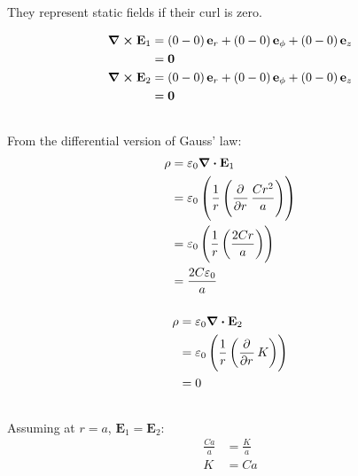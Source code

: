 \subsection{}
They represent static fields if their curl is zero.

\begin{align*}
    \curl{\mathbf{E}_1} & = \del{0 - 0}\mathbf{e}_r + \del{0 - 0}\mathbf{e}_{\phi} + \del{0 - 0}\mathbf{e}_z\\
    & = \mathbf{0}\\
    \curl{\mathbf{E}_2} & = \del{0 - 0}\mathbf{e}_r + \del{0 - 0}\mathbf{e}_{\phi} + \del{0 - 0}\mathbf{e}_z\\
    & = \mathbf{0}
\end{align*}

\subsection{}
\subsubsection{}
From the differential version of Gauss' law:
\begin{align*}
    \rho & = \varepsilon_0 \div{\mathbf{E}_1}\\
    & = \varepsilon_0 \del{\frac{1}{r} \del{\dpd{}{r} \frac{Cr^2}{a}}}\\
    & = \varepsilon_0 \del{\frac{1}{r} \del{\frac{2Cr}{a}}}\\
    & = \frac{2C \varepsilon_0}{a}
\end{align*}

\subsubsection{}
\begin{align*}
    \rho & = \varepsilon_0 \div{\mathbf{E}_2}\\
    & = \varepsilon_0 \del{\frac{1}{r} \del{\dpd{}{r} K}}\\
    & = 0
\end{align*}

\subsection{}
Assuming at $ r = a $, $ \mathbf{E}_1 = \mathbf{E}_2 $:
\begin{align*}
    \frac{Ca}{a} & = \frac{K}{a}\\
    K & = Ca
\end{align*}

